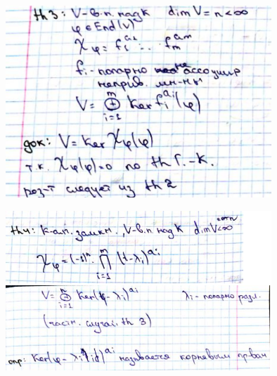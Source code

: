 \documentclass[algebra]{subfiles}
\begin{document}
    \begin{figure}[H]
            \includegraphics[width=10cm]{pics/57_3}
            \centering
    \end{figure}
    \begin{figure}[H]
            \includegraphics[width=10cm]{pics/57_4}
            \centering
    \end{figure}
\end{document}
